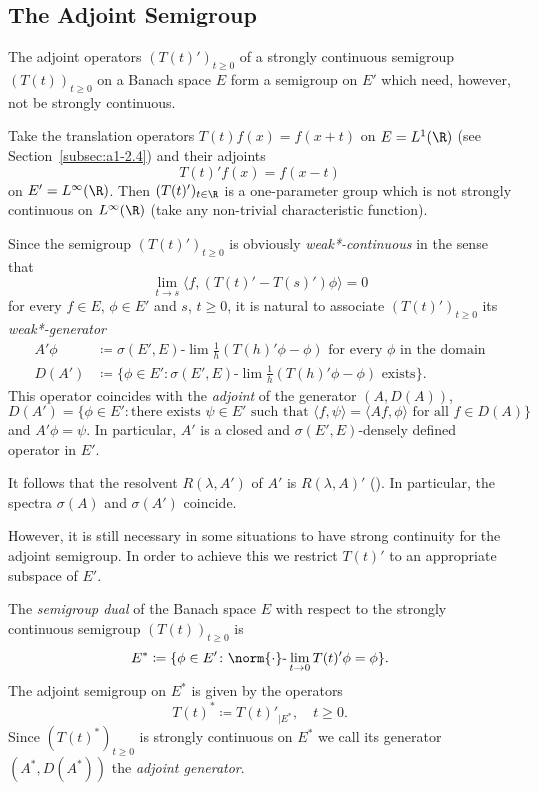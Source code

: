 \subsection{The Adjoint Semigroup}\label{subsec:a1-3.5}%
The adjoint operators $(T(t)')_{t \geq 0}$ of a strongly continuous semigroup $(T(t))_{t \geq 0}$ on a Banach space $E$ form a semigroup on $E'$ which need, however, not be strongly continuous.
\begin{example*}\label{ex:a1-3.2}
Take the translation operators $T(t)f(x) = f(x+t)$ on $E = L^{1}(\R)$ (see Section~\ref{subsec:a1-2.4}) and their adjoints
\[
    T(t)'f(x) = f(x-t)
\]
on $E' = L^{\infty}(\R)$.
Then $(T(t)')_{t \in \R}$ is a one-parameter group which is not strongly continuous on $L^{\infty}(\R)$ (take any non-trivial characteristic function).
\end{example*}

Since the semigroup $(T(t)')_{t \geq 0}$ is 
obviously \emph{weak*-continuous} in the sense that 
\[
\lim_{t \to s} \langle f,(T(t)'-T(s)')\phi \rangle = 0
\]
for every $f \in E$, $\phi \in E'$ and $s$, $t \geq 0$, it is natural to associate $(T(t)')_{t \geq 0}$ its  \emph{weak*-generator}
\begin{align*}
    A'\phi &\coloneqq \sigma(E',E)\text{-}\lim\frac{1}{h}(T(h)'\phi-\phi) \text{ for every } \phi \text{ in the domain} \\
    D(A') &\coloneqq \{\phi \in E' \colon \sigma(E',E)\text{-}\lim\frac{1}{h}(T(h)'\phi-\phi) \text{ exists}\}.
\end{align*}
This operator coincides with the \emph{adjoint} of the generator $(A,D(A))$, \ie
\[
    D(A') = \{\phi \in E' \colon \text{there exists } \psi \in E' \text{ such that } \langle f,\psi \rangle = \langle Af,\phi \rangle \text{ for all } f \in D(A)\}
\]
and $A'\phi = \psi$.
In particular, $A'$ is a closed and $\sigma(E',E)$-densely defined operator in $E'$.

It follows that the resolvent $R(\lambda,A')$ of\/ $A'$ is $R(\lambda,A)'$ 
(\textcite[Theorem~III.5.30]{kato:1976}).
In particular, the spectra $\sigma(A)$ and $\sigma(A')$ coincide.

However, it is still necessary in some situations to have strong continuity for the adjoint semigroup.
In order to achieve this we restrict $T(t)'$ to an appropriate subspace of\/ $E'$.
\begin{definition*}\label{def:a1-3.1}
The \emph{semigroup dual} of the Banach space $E$ with respect to the strongly continuous semigroup $(T(t))_{t \geq 0}$ is
\[
    E^{*} \coloneqq \{\phi \in E' \colon \norm{\cdot}\text{-}\lim_{t \to 0} T(t)'\phi = \phi\}.
\]
The adjoint semigroup on $E^{*}$ is given by the operators
\[
    T(t)^{*} \coloneqq T(t)'_{ \vert E^{*}}, \quad t \geq 0.
\]
Since $(T(t)^{*})_{t \geq 0}$ is strongly continuous on $E^{*}$ we call its generator $(A^{*},D(A^{*}))$ the \emph{adjoint generator}.
\end{definition*}

